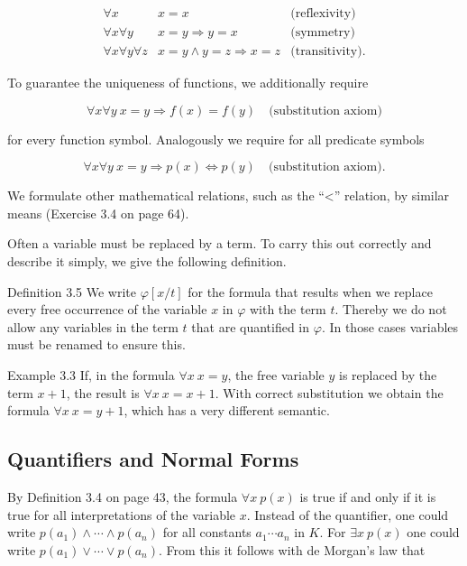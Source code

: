 \documentclass[10pt]{book}
\begin{document}
\[
\begin{array}{rll}
\forall x & x=x & \text{(reflexivity)} \\
\forall x \forall y & x=y \Rightarrow y=x & \text{(symmetry)} \tag{3.1}\\
\forall x \forall y \forall z & x=y \wedge y=z \Rightarrow x=z & \text{(transitivity).}
\end{array}
\]

To guarantee the uniqueness of functions, we additionally require

\begin{equation*}
\forall x \forall y \ x=y \Rightarrow f(x)=f(y) \quad \text{(substitution axiom)} \tag{3.2}
\end{equation*}

for every function symbol. Analogously we require for all predicate symbols

\begin{equation*}
\forall x \forall y \ x=y \Rightarrow p(x) \Leftrightarrow p(y) \quad \text{(substitution axiom).} \tag{3.3}
\end{equation*}

We formulate other mathematical relations, such as the ``<'' relation, by similar means (Exercise 3.4 on page 64).

Often a variable must be replaced by a term. To carry this out correctly and describe it simply, we give the following definition.

Definition 3.5 We write $\varphi[x/t]$ for the formula that results when we replace every free occurrence of the variable $x$ in $\varphi$ with the term $t$. Thereby we do not allow any variables in the term $t$ that are quantified in $\varphi$. In those cases variables must be renamed to ensure this.

Example 3.3 If, in the formula $\forall x \ x=y$, the free variable $y$ is replaced by the term $x+1$, the result is $\forall x \ x=x+1$. With correct substitution we obtain the formula $\forall x \ x=y+1$, which has a very different semantic.

\subsection{Quantifiers and Normal Forms}
By Definition 3.4 on page 43, the formula $\forall x \ p(x)$ is true if and only if it is true for all interpretations of the variable $x$. Instead of the quantifier, one could write $p(a_{1}) \wedge \cdots \wedge p(a_{n})$ for all constants $a_{1} \cdots a_{n}$ in $K$. For $\exists x \ p(x)$ one could write $p(a_{1}) \vee \cdots \vee p(a_{n})$. From this it follows with de Morgan's law that
\end{document}
